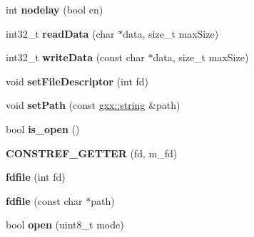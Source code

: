 \begin{DoxyCompactItemize}
\item 
int {\bfseries nodelay} (bool en)\hypertarget{classgxx_1_1io_1_1fdfile_af1f04e5ea0f802ed249e7e70f22e640a}{}\label{classgxx_1_1io_1_1fdfile_af1f04e5ea0f802ed249e7e70f22e640a}

\item 
int32\+\_\+t {\bfseries read\+Data} (char $\ast$data, size\+\_\+t max\+Size)\hypertarget{classgxx_1_1io_1_1fdfile_aab55e428338784966263ce9311c752ea}{}\label{classgxx_1_1io_1_1fdfile_aab55e428338784966263ce9311c752ea}

\item 
int32\+\_\+t {\bfseries write\+Data} (const char $\ast$data, size\+\_\+t max\+Size)\hypertarget{classgxx_1_1io_1_1fdfile_aa6b10070a559b46de324b6a01e7ef7d5}{}\label{classgxx_1_1io_1_1fdfile_aa6b10070a559b46de324b6a01e7ef7d5}

\item 
void {\bfseries set\+File\+Descriptor} (int fd)\hypertarget{classgxx_1_1io_1_1fdfile_a0c30dc106a3dada39e830a2f39a11fed}{}\label{classgxx_1_1io_1_1fdfile_a0c30dc106a3dada39e830a2f39a11fed}

\item 
void {\bfseries set\+Path} (const \hyperlink{classgxx_1_1basic__string}{gxx\+::string} \&path)\hypertarget{classgxx_1_1io_1_1fdfile_a7d855019c768ee5d4f656d9289bf49ab}{}\label{classgxx_1_1io_1_1fdfile_a7d855019c768ee5d4f656d9289bf49ab}

\item 
bool {\bfseries is\+\_\+open} ()\hypertarget{classgxx_1_1io_1_1fdfile_afc7c22aef521c4466e4c6d19a40afd5e}{}\label{classgxx_1_1io_1_1fdfile_afc7c22aef521c4466e4c6d19a40afd5e}

\item 
{\bfseries C\+O\+N\+S\+T\+R\+E\+F\+\_\+\+G\+E\+T\+T\+ER} (fd, m\+\_\+fd)\hypertarget{classgxx_1_1io_1_1fdfile_acdee1a0d8c4f6ea45734ec8a421da42d}{}\label{classgxx_1_1io_1_1fdfile_acdee1a0d8c4f6ea45734ec8a421da42d}

\item 
{\bfseries fdfile} (int fd)\hypertarget{classgxx_1_1io_1_1fdfile_acd19f40ea5bddf489b5ba31e7e7e92b6}{}\label{classgxx_1_1io_1_1fdfile_acd19f40ea5bddf489b5ba31e7e7e92b6}

\item 
{\bfseries fdfile} (const char $\ast$path)\hypertarget{classgxx_1_1io_1_1fdfile_a91ed2c96d8b0f11743c757382c03856d}{}\label{classgxx_1_1io_1_1fdfile_a91ed2c96d8b0f11743c757382c03856d}

\item 
bool {\bfseries open} (uint8\+\_\+t mode)\hypertarget{classgxx_1_1io_1_1fdfile_a4136ebc1a0cb06959d77a3a208370499}{}\label{classgxx_1_1io_1_1fdfile_a4136ebc1a0cb06959d77a3a208370499}


\end{DoxyCompactItemize}
